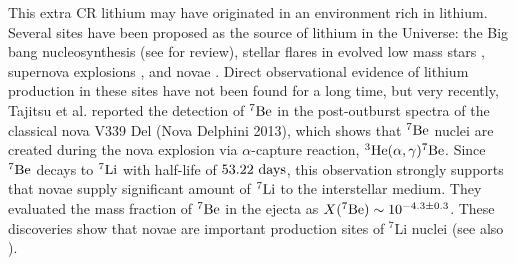 \documentclass[twocolumn,showpacs,amsmath,amssymb]{revtex4-1}
\begin{document}
This extra CR lithium may have originated in an environment rich in lithium.  Several sites have been proposed as the source of lithium in the Universe: the Big bang nucleosynthesis (see \cite{2016RvMP...88a5004C} for review), stellar flares in evolved low mass stars \cite{1995ApJ...453..810D}, supernova explosions \cite{1978Ap&SS..58..273D}, and novae \cite{1978ApJ...222..600S}.  Direct observational evidence of lithium production in these sites have not been found for a long time, but very recently, Tajitsu et al.\cite{2015Natur.518..381T} reported the detection of $^7 {\rm Be}$ in the post-outburst spectra of the classical nova V339 Del (Nova Delphini 2013), which shows that $^7{\rm Be}$ nuclei are created during the nova explosion via $\alpha$-capture reaction, $^3{\rm He}(\alpha,\gamma)^7{\rm Be}$.  Since $^7{\rm Be}$ decays to $^7{\rm Li}$ with half-life of $53.22~{\rm days}$, this observation strongly supports that novae supply significant amount of $^7{\rm Li}$ to the interstellar medium.  They evaluated the mass fraction of $^7{\rm Be}$ in the ejecta as $X(^7{\rm Be})\sim 10^{-4.3\pm 0.3}$.  These discoveries show that novae are important production sites of $^7$Li nuclei (see also \cite{2015ApJ...808L..14I, 2016MNRAS.463L.117M, 2016ApJ...818..191T}).  
\end{document}
